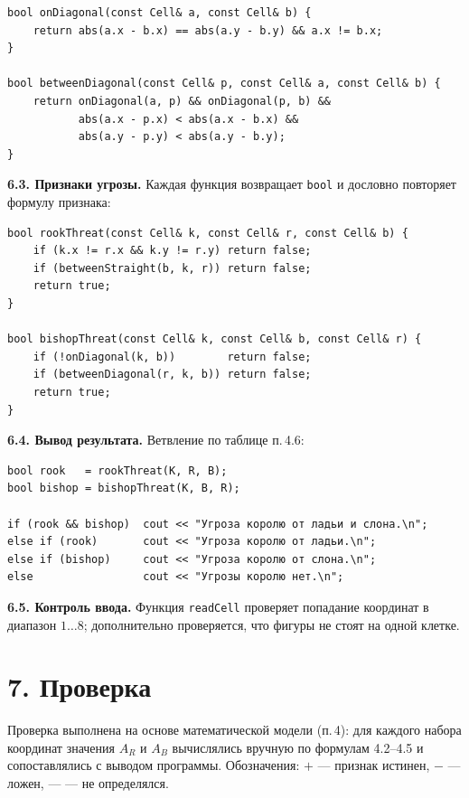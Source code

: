 \documentclass[12pt,a4paper]{article}
\begin{document}
\begin{Verbatim}
bool onDiagonal(const Cell& a, const Cell& b) {
    return abs(a.x - b.x) == abs(a.y - b.y) && a.x != b.x;
}

bool betweenDiagonal(const Cell& p, const Cell& a, const Cell& b) {
    return onDiagonal(a, p) && onDiagonal(p, b) &&
           abs(a.x - p.x) < abs(a.x - b.x) &&
           abs(a.y - p.y) < abs(a.y - b.y);
}
\end{Verbatim}

\textbf{6.3. Признаки угрозы.} Каждая функция возвращает \texttt{bool}
и дословно повторяет формулу признака:

\begin{Verbatim}
bool rookThreat(const Cell& k, const Cell& r, const Cell& b) {
    if (k.x != r.x && k.y != r.y) return false;
    if (betweenStraight(b, k, r)) return false;
    return true;
}

bool bishopThreat(const Cell& k, const Cell& b, const Cell& r) {
    if (!onDiagonal(k, b))        return false;
    if (betweenDiagonal(r, k, b)) return false;
    return true;
}
\end{Verbatim}

\textbf{6.4. Вывод результата.} Ветвление по таблице п.\,4.6:

\begin{Verbatim}
bool rook   = rookThreat(K, R, B);
bool bishop = bishopThreat(K, B, R);

if (rook && bishop)  cout << "Угроза королю от ладьи и слона.\n";
else if (rook)       cout << "Угроза королю от ладьи.\n";
else if (bishop)     cout << "Угроза королю от слона.\n";
else                 cout << "Угрозы королю нет.\n";
\end{Verbatim}

\textbf{6.5. Контроль ввода.} Функция \texttt{readCell} проверяет
попадание координат в диапазон $1\ldots 8$; дополнительно проверяется,
что фигуры не стоят на одной клетке.

\section*{7. Проверка}

Проверка выполнена на основе математической модели (п.\,4): для каждого
набора координат значения $A_R$ и $A_B$ вычислялись вручную по формулам
4.2--4.5 и сопоставлялись с выводом программы. Обозначения: $+$ ---
признак истинен, $-$ --- ложен, --- --- не определялся.
\end{document}
